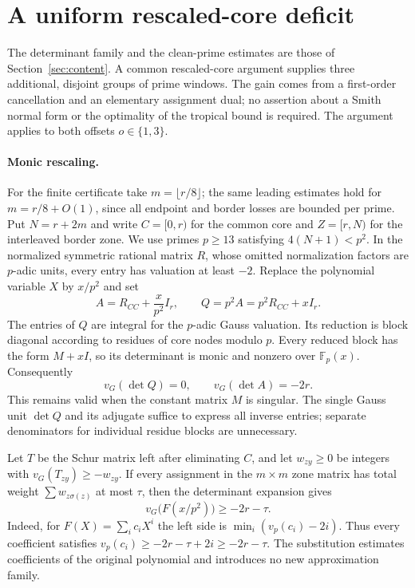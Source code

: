 \section{A uniform rescaled-core deficit}
\label{sec:uniform-deficit}

The determinant family and the clean-prime estimates are those of
Section~\ref{sec:content}.  A common rescaled-core argument supplies three additional,
disjoint groups of prime windows.  The gain comes from a first-order
cancellation and an elementary assignment dual; no assertion about a Smith
normal form or the optimality of the tropical bound is required.
The argument applies to both offsets $o\in\{1,3\}$.

\paragraph{Monic rescaling.}
For the finite certificate take $m=\lfloor r/8\rfloor$; the same leading estimates hold for
$m=r/8+O(1)$, since all endpoint and border losses are bounded per prime. Put $N=r+2m$ and write $C=[0,r)$ for the
common core and $Z=[r,N)$ for the interleaved border zone.  We use primes
$p\ge13$ satisfying $4(N+1)<p^2$.  In the normalized symmetric rational
matrix $R$, whose omitted normalization factors are $p$-adic units, every
entry has valuation at least $-2$.  Replace the polynomial variable $X$
by $x/p^2$ and set
\[
 A=R_{CC}+\frac{x}{p^2}I_r,\qquad Q=p^2A=p^2R_{CC}+xI_r.
\]
The entries of $Q$ are integral for the $p$-adic Gauss valuation.  Its
reduction is block diagonal according to residues of core nodes modulo
$p$.  Every reduced block has the form $M+xI$, so its determinant is
monic and nonzero over $\mathbb F_p(x)$.  Consequently
\[
 v_G(\det Q)=0,\qquad v_G(\det A)=-2r.
\]
This remains valid when the constant matrix $M$ is singular.  The single
Gauss unit $\det Q$ and its adjugate suffice to express all inverse
entries; separate denominators for individual residue blocks are unnecessary.

Let $T$ be the Schur matrix left after eliminating $C$, and let $w_{zy}\ge0$ be
integers with $v_G(T_{zy})\ge-w_{zy}$. If every assignment in the $m\times m$
zone matrix has total weight $\sum w_{z\sigma(z)}$ at most $\tau$, then the
determinant expansion gives
\[
 v_G\bigl(F(x/p^2)\bigr)\ge-2r-\tau.
\]
Indeed, for $F(X)=\sum_i c_iX^i$ the left side is
$\min_i(v_p(c_i)-2i)$.  Thus every coefficient satisfies
$v_p(c_i)\ge-2r-\tau+2i\ge-2r-\tau$.
The substitution estimates coefficients of the original polynomial and
introduces no new approximation family.

